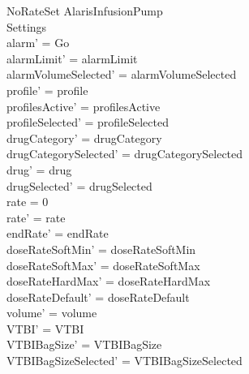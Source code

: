 \begin{schema}{NoRateSet}
	\Delta AlarisInfusionPump\\
	Settings\\
	\where
	alarm' = Go\\
	alarmLimit' = alarmLimit\\
	alarmVolumeSelected' = alarmVolumeSelected\\
	profile' = profile\\
	profilesActive' = profilesActive\\  
	  profileSelected' = profileSelected\\
	drugCategory' = drugCategory\\ drugCategorySelected' = drugCategorySelected\\
	drug' = drug\\ drugSelected' = drugSelected\\
	rate = 0\\
	rate' = rate\\
	endRate' = endRate\\
	doseRateSoftMin' = doseRateSoftMin\\
	doseRateSoftMax' = doseRateSoftMax\\
	doseRateHardMax' = doseRateHardMax\\
	doseRateDefault' = doseRateDefault\\
	volume' = volume\\
	VTBI' = VTBI\\
	VTBIBagSize' = VTBIBagSize\\ VTBIBagSizeSelected' = VTBIBagSizeSelected\\

\end{schema}
